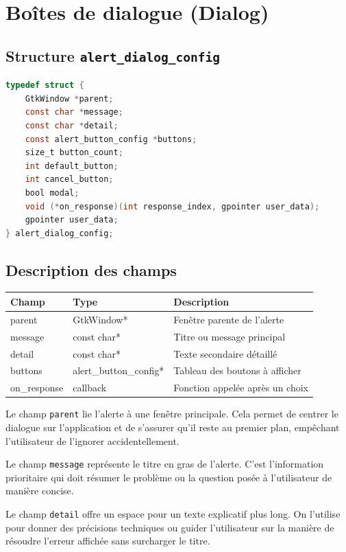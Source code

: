 \section{Boîtes de dialogue (Dialog)}

\subsection{Structure \texttt{alert\_dialog\_config}}
\begin{lstlisting}[language=C]
typedef struct {
    GtkWindow *parent;
    const char *message;
    const char *detail;
    const alert_button_config *buttons;
    size_t button_count;
    int default_button;
    int cancel_button;
    bool modal;
    void (*on_response)(int response_index, gpointer user_data);
    gpointer user_data;
} alert_dialog_config;
\end{lstlisting}

\subsection{Description des champs}
\begin{center}
\begin{tabular}{|l|l|p{5cm}|}
\hline
\textbf{Champ} & \textbf{Type} & \textbf{Description} \\
\hline
parent & GtkWindow* & Fenêtre parente de l'alerte \\
\hline
message & const char* & Titre ou message principal \\
\hline
detail & const char* & Texte secondaire détaillé \\
\hline
buttons & alert\_button\_config* & Tableau des boutons à afficher \\
\hline
on\_response & callback & Fonction appelée après un choix \\
\hline
\end{tabular}
\end{center}

\bigskip

Le champ \texttt{parent} lie l'alerte à une fenêtre principale. Cela permet de centrer le dialogue sur l'application et de s'assurer qu'il reste au premier plan, empêchant l'utilisateur de l'ignorer accidentellement.

Le champ \texttt{message} représente le titre en gras de l'alerte. C'est l'information prioritaire qui doit résumer le problème ou la question posée à l'utilisateur de manière concise.

Le champ \texttt{detail} offre un espace pour un texte explicatif plus long. On l'utilise pour donner des précisions techniques ou guider l'utilisateur sur la manière de résoudre l'erreur affichée sans surcharger le titre.

